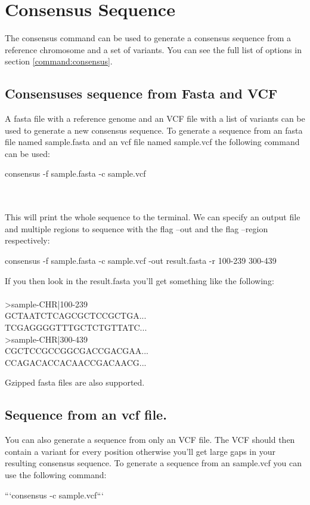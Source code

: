 \section{Consensus Sequence}
The consensus command can be used to generate a consensus sequence from a reference chromosome and a set of variants. You can see the full list of options in section \ref{command:consensus}.

\subsection{Consensuses sequence from Fasta and VCF}
A fasta file with a reference genome and an VCF file with a list of variants can be used to generate a new consensus sequence. To generate a sequence from an fasta file named sample.fasta and an vcf file named sample.vcf the following command can be used:\\
\begin{markdown}
consensus -f sample.fasta -c sample.vcf
\end{markdown}
\\
\\
This will print the whole sequence to the terminal. We can specify an output file and multiple regions to sequence with the flag --out and the flag --region respectively:\\
\begin{markdown}
consensus -f sample.fasta -c sample.vcf -out result.fasta -r 100-239 300-439
\end{markdown}

If you then look in the result.fasta you'll get something like the following:\\
\\
>sample-CHR|100-239\\
GCTAATCTCAGCGCTCCGCTGA...\\
TCGAGGGGTTTGCTCTGTTATC...\\
>sample-CHR|300-439\\
CGCTCCGCCGGCGACCGACGAA...\\
CCAGACACCACAACCGACAACG...

Gzipped fasta files are also supported.

\subsection{Sequence from an vcf file.}
You can also generate a sequence from only an VCF file. The VCF should then contain a variant for every position otherwise you'll get large gaps in your resulting consensus sequence. To generate a sequence from an sample.vcf you can use the following command:\\
\begin{markdown}
```consensus -c sample.vcf```
\end{markdown}

